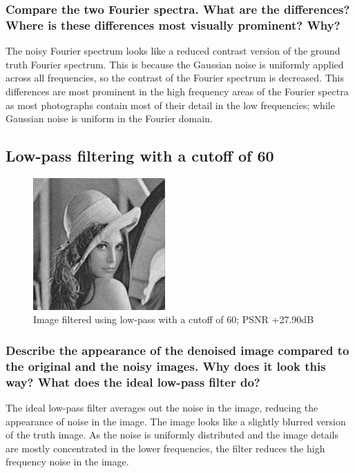 \documentclass[article, 1.5space, letterpaper, 12pt, oneside, header, footer]{SydeClass}
\begin{document}
\subsubsection{Compare the two Fourier spectra. What are the differences? Where is these differences most visually
prominent? Why?}

The noisy Fourier spectrum looks like a reduced contrast version of the ground truth Fourier spectrum. This is because the Gaussian noise is uniformly applied across all frequencies, so the contrast of the Fourier spectrum is decreased. This differences are most prominent in the high frequency areas of the Fourier spectra as most photographs contain most of their detail in the low frequencies; while Gaussian noise is uniform in the Fourier domain.


\subsection{Low-pass filtering with a cutoff of 60}
\begin{figure}[ht]
\centering
	\includegraphics[width=0.45\textwidth]{question5/2_lena_LFP_60}
	\caption{Image filtered using low-pass with a cutoff of 60; PSNR +27.90dB}
\end{figure}

\subsubsection{Describe the appearance of the denoised image compared to the original and the noisy images. Why does it look this way? What does the ideal low-pass filter do?}

The ideal low-pass filter averages out the noise in the image, reducing the appearance of noise in the image. The image looks like a slightly blurred version of the truth image. As the noise is uniformly distributed and the image details are mostly concentrated in the lower frequencies, the filter reduces the high frequency noise in the image.
\end{document}
